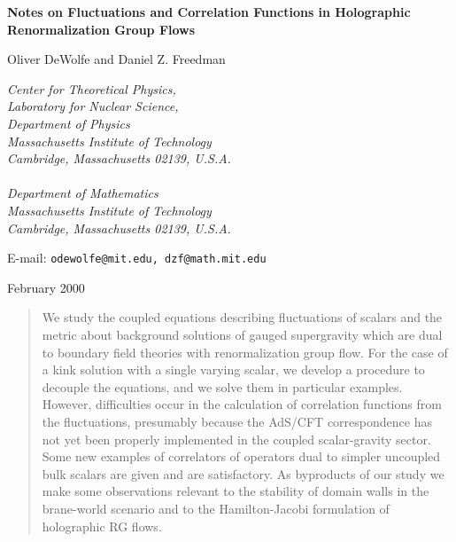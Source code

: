 \documentclass[a4paper,12pt]{article}
\begin{document}
\setlength{\baselineskip}{14pt} %
\setlength{\parskip}{1.35ex}
\setlength{\parindent}{0em}

\noindent

\thispagestyle{empty}
{}

\vspace{.3in}
\begin{center}\Large {\bf 
Notes on Fluctuations and Correlation Functions 
in Holographic Renormalization Group Flows}
\end{center}


\vspace{.1in}
\begin{center}
{\large Oliver DeWolfe\coordHE{} and Daniel Z. Freedman\coordHE{}}

\vspace{.1in}
{ {\it {}\coordHE{}Center for Theoretical Physics,\\
Laboratory for Nuclear Science,\\
Department of Physics\\
Massachusetts Institute of Technology\\
Cambridge, Massachusetts 02139, U.S.A. \\ \ \\
\coordHE{}Department of Mathematics \\
Massachusetts Institute of Technology\\
Cambridge, Massachusetts 02139, U.S.A.}}
\vspace{.2in}

E-mail: {\tt odewolfe@mit.edu, dzf@math.mit.edu}
\end{center}
\begin{center}February 2000\end{center}

\vspace{0.1in}
\begin{abstract}
We study the coupled equations describing fluctuations of scalars and
the metric about background solutions of \coordHE{} gauged
supergravity which are dual to boundary field theories with
renormalization group flow. For the case of a kink solution with a
single varying scalar, we develop a procedure to decouple the
equations, and we solve them in particular examples. However,
difficulties occur in the calculation of correlation functions from
the fluctuations, presumably because the AdS/CFT correspondence has
not yet been properly implemented in the coupled scalar-gravity
sector.  Some new examples of correlators of operators dual to simpler
uncoupled bulk scalars are given and are satisfactory. As byproducts
of our study we make some observations relevant to the stability of
domain walls in the brane-world scenario and to the Hamilton-Jacobi
formulation of holographic RG flows.
\end{abstract}
\end{document}
